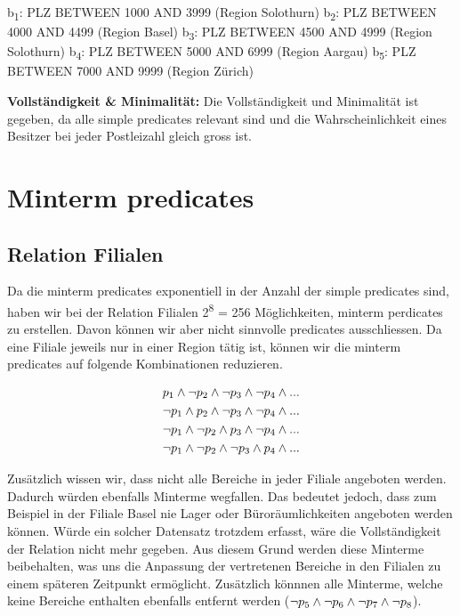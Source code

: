 \documentclass[11pt,a4paper,parskip=half]{scrartcl}
\begin{document}
b\textsubscript{1}: PLZ BETWEEN 1000 AND 3999 (Region Solothurn)\newline
b\textsubscript{2}: PLZ BETWEEN 4000 AND 4499 (Region Basel)\newline
b\textsubscript{3}: PLZ BETWEEN 4500 AND 4999 (Region Solothurn)\newline
b\textsubscript{4}: PLZ BETWEEN 5000 AND 6999 (Region Aargau)\newline
b\textsubscript{5}: PLZ BETWEEN 7000 AND 9999 (Region Zürich)\newline

\textbf{Vollständigkeit \& Minimalität: } Die Vollständigkeit und Minimalität ist gegeben, da alle simple predicates relevant sind und die Wahrscheinlichkeit eines Besitzer bei jeder Postleizahl gleich gross ist.

\section{Minterm predicates}
\subsection{Relation Filialen}
Da die minterm predicates exponentiell in der Anzahl der simple predicates sind, haben wir bei der Relation Filialen 2\textsuperscript{8} = 256 Möglichkeiten, minterm perdicates zu erstellen. Davon können wir aber nicht sinnvolle predicates ausschliessen. Da eine Filiale jeweils nur in einer Region tätig ist, können wir die minterm predicates auf folgende Kombinationen reduzieren.

\begin{align*}
	p\textsubscript{1} \wedge \neg p\textsubscript{2} \wedge \neg p\textsubscript{3} \wedge \neg p\textsubscript{4} \wedge ...\\
	\neg p\textsubscript{1} \wedge p\textsubscript{2} \wedge \neg p\textsubscript{3} \wedge \neg p\textsubscript{4} \wedge ...\\
	\neg p\textsubscript{1} \wedge \neg p\textsubscript{2} \wedge p\textsubscript{3} \wedge \neg p\textsubscript{4} \wedge ...\\
	\neg p\textsubscript{1} \wedge \neg p\textsubscript{2} \wedge \neg p\textsubscript{3} \wedge p\textsubscript{4} \wedge ...\\
\end{align*}

Zusätzlich wissen wir, dass nicht alle Bereiche in jeder Filiale angeboten werden. Dadurch würden ebenfalls Minterme wegfallen. Das bedeutet jedoch, dass zum Beispiel in der Filiale Basel nie Lager oder Büroräumlichkeiten angeboten werden können. Würde ein solcher Datensatz trotzdem erfasst, wäre die Vollständigkeit der Relation nicht mehr gegeben. Aus diesem Grund werden diese Minterme beibehalten, was uns die Anpassung der vertretenen Bereiche in den Filialen zu einem späteren Zeitpunkt ermöglicht. Zusätzlich könnnen alle Minterme, welche keine Bereiche enthalten ebenfalls entfernt werden ($\neg p\textsubscript{5} \wedge \neg p\textsubscript{6} \wedge \neg p\textsubscript{7} \wedge \neg p\textsubscript{8}$).
\end{document}
